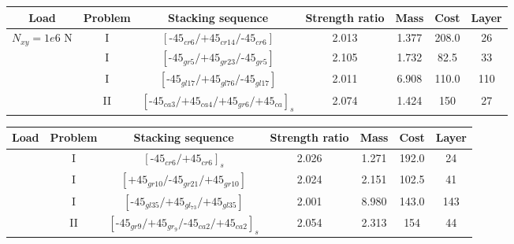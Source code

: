\documentclass[smallextended]{svjour3}       %
\begin{document}
\begin{center}
\begin{tabular}{ccccccc}
	\toprule
	Load                               &Problem   & Stacking sequence        & Strength ratio  & Mass &  Cost   & Layer    \\
	\midrule
	\multirow{4}{*}{$N_{xy}=1e6$ N}	   &    I      &  $[\text{-}45_{cr6}/\text{+}45_{cr14}/\text{-}45_{cr6}]$                  & 2.013           & 1.377 &  208.0  & 26  \\
									   &    I      &  $[\text{-}45_{gr5}/\text{+}45_{gr23}/\text{-}45_{gr5}]$                & 2.105           & 1.732 &  82.5   & 33  \\
									   &    I      &  $[\text{-}45_{gl17}/\text{+}45_{gl76}/\text{-}45_{gl17}]$               & 2.011           & 6.908 &  110.0  & 110  \\
									   &    II     &  $[\text{-}45_{ca3}/\text{+}45_{ca4}/\text{+}45_{gr6}/\text{+}45_{ca}]_s$    & 2.074    & 1.424 &  150    & 27 \\
	\bottomrule
\end{tabular}
\end{center}

\begin{center}
\begin{tabular}{ccccccc}
	\toprule
	Load                                                        &Problem& Stacking sequence                                & Strength ratio  & Mass &  Cost   & Layer    \\
	\midrule
	       &       I                &  $[\text{-}45_{cr6}/\text{+}45_{cr6}]_s$                        & 2.026           & 1.271 &  192.0  & 24  \\
																&       I                &  $[\text{+}45_{gr10}/\text{-}45_{gr21}/\text{+}45_{gr10}]$            & 2.024           & 2.151 &  102.5  & 41  \\
																&       I                &  $[\text{-}45_{gl35}/\text{+}45_{gl_73}/\text{+}45_{gl35}]$            & 2.001           & 8.980 &  143.0  & 143  \\
																&       II                &
	$[\text{-}45_{gr9}/\text{+}45_{gr_9}/\text{-}45_{ca2}/\text{+}45_{ca2}]_s$            & 2.054         & 2.313 &
																		  154& 44  \\
	\bottomrule
\end{tabular}
\end{center}
\end{document}
